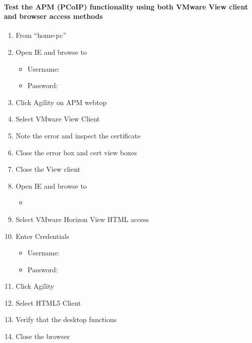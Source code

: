 \documentclass[letterpaper,10pt,english]{sphinxmanual}
\begin{document}
\paragraph{Test the APM (PCoIP) functionality using both VMware View client and browser access methods}
\label{\detokenize{class2/module1/lab1:test-the-apm-pcoip-functionality-using-both-vmware-view-client-and-browser-access-methods}}\begin{enumerate}
\item {} 
From “home-pc”

\item {} 
Open IE and browse to 
\begin{itemize}
\item {} 
Username: 

\item {} 
Password: 

\end{itemize}

\item {} 
Click Agility on APM webtop

\item {} 
Select VMware View Client

\item {} 
Note the error and inspect the certificate

\item {} 
Close the error box and cert view boxes

\item {} 
Close the View client

\item {} 
Open IE and browse to
\begin{itemize}
\item {} 

\end{itemize}

\item {} 
Select VMware Horizon View HTML access

\item {} 
Enter Credentials
\begin{itemize}
\item {} 
Username: 

\item {} 
Password: 

\end{itemize}

\item {} 
Click Agility

\item {} 
Select HTML5 Client

\item {} 
Verify that the desktop functions

\item {} 
Close the browser

\end{enumerate}
\end{document}
